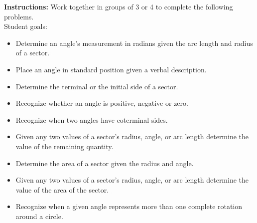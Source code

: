 



\noindent \textbf{Instructions:}  Work together in groups of  3 or 4 to complete the following problems.\\

Student goals:
\begin{itemize}
\item Determine an angle's measurement in radians given the arc length
  and radius of a sector.
\item Place an angle in standard position given a verbal description.
\item Determine the terminal or the initial side of a sector.
\item Recognize whether an angle is positive, negative or zero.
\item Recognize when two angles have coterminal sides.
\item Given any two values of a sector's radius, angle, or arc length
  determine the value of the remaining quantity.
\item Determine the area of a sector given the radius and angle.
\item Given any two values of a sector's radius, angle, or arc length
  determine the value of the area of the sector.
\item Recognize when a given angle represents more than one complete
  rotation around a circle.
\end{itemize}


